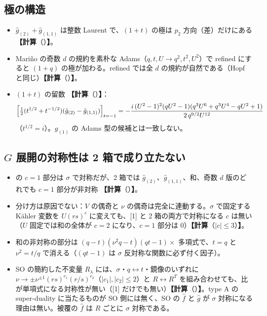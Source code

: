 \documentclass[a4paper,10pt]{ltjsarticle}
\newcommand{\comp}[1]{\textbf{【計算}\if\relax\detokenize{#1}\relax\else（#1）\fi\textbf{】}}
\begin{document}
\subsection{極の構造}
\begin{itemize}
\item $\hat g_{(2)} + \hat g_{(1,1)}$ は整数 Laurent で、$(1+t)$ の極は $p_2$ 方向（差）だけにある \comp{}。
\item Mariño の奇数 $d$ の規約を素朴な Adams（$q, t, U \to q^2, t^2, U^2$）で refined にすると $(1 + q)$ の極が加わる。refined では全 $d$ の規約が自然である（Hopf と同じ）\comp{}。
\item $(1+t)$ の留数 \comp{}：
\[
\Bigl[\tfrac12 (t^{1/2} + t^{-1/2})(\hat g_{(2)} - \hat g_{(1,1)})\Bigr]_{t = -1}
= -\frac{i\,(U^2 - 1)^2 (qU^2 - 1)(q^3 U^6 + q^3 U^4 - q U^2 + 1)}{2\, q^{9/2} U^{12}}
\]
（$t^{1/2} = i$）。$g_{(1)}$ の Adams 型の候補とは一致しない。
\end{itemize}

\subsection{$G$ 展開の対称性は 2 箱で成り立たない}
\begin{itemize}
\item [1] の $c = 1$ 部分は $\sigma$ で対称だが、2 箱では $\hat g_{(2)}$、$\hat g_{(1,1)}$、和、奇数 $d$ 版のどれでも $c = 1$ 部分が非対称 \comp{}。
\item 分け方は原因でない：$V$ の偶奇と $\nu$ の偶奇は完全に連動する。$\sigma$ で固定する Kähler 変数を $U (rs)^c$ に変えても、[1] と 2 箱の両方で対称になる $c$ は無い（$U$ 固定では和の全体が $c = 2$ になり、$c = 1$ 部分は 0）\comp{$|c| \le 3$}。
\item 和の非対称の部分は $(q - t)(\nu^2 q - t)(qt - 1) \times$ 多項式で、$t = q$ と $\nu^2 = t/q$ で消える（$(qt - 1)$ は $\sigma$ 反対称な関数に必ず付く因子）。
\item SO の簡約した不変量 $R_\lambda$ には、$\sigma$・$q \leftrightarrow t$・鏡像のいずれに $\nu \to \pm \nu^{\pm 1} (rs)^{c_1} (r/s)^{c_2}$（$|c_1|, |c_2| \le 2$）と $R \leftrightarrow R^T$ を組み合わせても、比が単項式になる対称性が無い（[1] だけでも無い）\comp{}。type A の super-duality に当たるものが SO 側には無く、SO の $\hat f$ と $\hat g$ が $\sigma$ 対称になる理由は無い。被覆の $\hat f$ は $R$ ごとに $\sigma$ 対称である。
\end{itemize}
\end{document}
